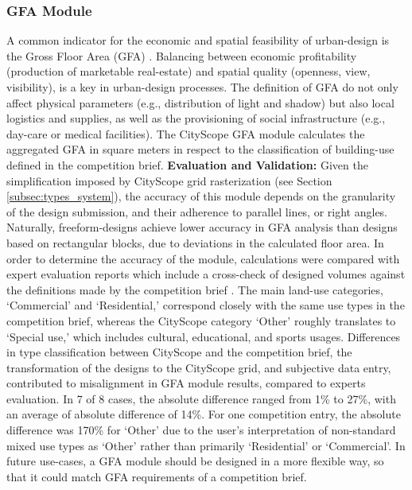 {{        \subsubsection{GFA Module}
        {
            A common indicator for the economic and spatial feasibility of urban-design is the Gross Floor Area (GFA) \cite{fcc18}. Balancing between economic profitability (production of marketable real-estate) and spatial quality (openness, view, visibility), is a key in urban-design processes. The definition of GFA do not only affect physical parameters (e.g., distribution of light and shadow) but also local logistics and supplies, as well as the provisioning of social infrastructure (e.g., day-care or medical facilities). The CityScope GFA module calculates the aggregated GFA in square meters in respect to the classification of building-use defined in the competition brief.
            \newline
            \textbf{Evaluation and Validation:} Given the simplification imposed by CityScope grid rasterization (see Section \eqref{subsec:types_system}), the accuracy of this module depends on the granularity of the design submission, and their adherence to parallel lines, or right angles. Naturally, freeform-designs achieve lower accuracy in GFA analysis than designs based on rectangular blocks, due to deviations in the calculated floor area. In order to determine the accuracy of the module, calculations were compared with expert evaluation reports which include a cross-check of designed volumes against the definitions made by the competition brief \cite{e19}. The main land-use categories, `Commercial' and `Residential,' correspond closely with the same use types in the competition brief, whereas the CityScope category `Other' roughly translates to `Special use,' which includes cultural, educational, and sports usages.
            \newline
            Differences in type classification between CityScope and the competition brief, the transformation of the designs to the CityScope grid, and subjective data entry, contributed to misalignment in GFA module results, compared to experts evaluation. In 7 of 8 cases, the absolute difference ranged from 1\% to 27\%, with an average of absolute difference of 14\%. For one competition entry, the absolute difference was 170\% for `Other' due to the user's interpretation of non-standard mixed use types as `Other' rather than primarily `Residential' or `Commercial'. In future use-cases, a GFA module should be designed in a more flexible way, so that it could match GFA requirements of a competition brief.
        }
    }

}
